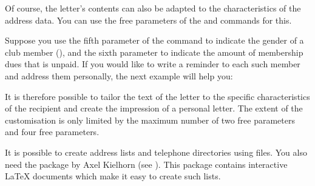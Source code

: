 Of course, the letter's contents can also be adapted to the characteristics of
the address data. You can use the free parameters of the
 and 
commands for this.
\begin{Example}
  Suppose you use the fifth parameter of the 
  command to indicate the gender of a club member (), and the
  sixth parameter to indicate the amount of membership dues that is unpaid.
  If you would like to write a reminder to each such member and address them
  personally, the next example will help you:
\begin{lstcode}
  \renewcommand*{\adrentry}[8]{
    \ifdim #6pt>0pt\relax
      \begin{letter}{#2 #1\\#3}
        \if #5m \opening{Dear Mr #2,} \fi
        \if #5f \opening{Dear Ms #2,} \fi

        Unfortunately, we have noticed that you are in arrears
        with the payment of your membership fees.

        Please remit the outstanding balance of \pounds #6 to the club
        account.
       \closing{Regards,}
      \end{letter}
     \fi
  }
\end{lstcode}
\end{Example}
It is therefore possible to tailor the text of the letter to the specific
characteristics of the recipient and create the impression of a personal
letter. The extent of the customisation is only limited by the maximum number
of two free  parameters and four free
 parameters.


\begin{Declaration}
\end{Declaration}
%
It is possible to create address lists and telephone directories using
 files. You also need the 
package by Axel Kielhorn (see \cite{package:adrconv}). This package contains
interactive \LaTeX{} documents which make it easy to create such lists.

